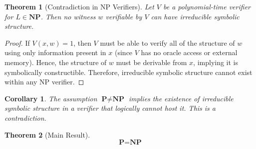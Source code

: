 \documentclass[12pt]{article}
\newtheorem{theorem}{Theorem}
\newtheorem{corollary}{Corollary}
\begin{document}
\begin{theorem}[Contradiction in NP Verifiers]
Let $V$ be a polynomial-time verifier for $L \in \textbf{NP}$. Then no witness $w$ verifiable by $V$ can have irreducible symbolic structure.
\end{theorem}

\begin{proof}
If $V(x, w) = 1$, then $V$ must be able to verify all of the structure of $w$ using only information present in $x$ (since $V$ has no oracle access or external memory). Hence, the structure of $w$ must be derivable from $x$, implying it is symbolically constructible. Therefore, irreducible symbolic structure cannot exist within any NP verifier.
\end{proof}

\begin{corollary}
The assumption $\textbf{P} \ne \textbf{NP}$ implies the existence of irreducible symbolic structure in a verifier that logically cannot host it. This is a contradiction.
\end{corollary}

\begin{theorem}[Main Result]
\[
\boxed{\textbf{P} = \textbf{NP}}
\]
\end{theorem}
\end{document}
